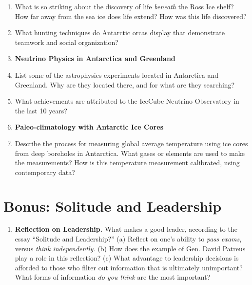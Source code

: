 \documentclass[10pt]{article}
\begin{document}
\begin{enumerate}
\item What is so striking about the discovery of life \textit{beneath} the Ross Ice shelf?  How far away from the sea ice does life extend? How was this life discovered? \\ \vspace{1.5cm}
\item What hunting techniques do Antarctic orcas display that demonstrate teamwork and social organization? \\ \vspace{1.5cm}
\item \textbf{Neutrino Physics in Antarctica and Greenland}
\item List some of the astrophysics experiments located in Antarctica and Greenland.  Why are they located there, and for what are they searching? \\ \vspace{1.5cm}
\item What achievements are attributed to the IceCube Neutrino Observatory in the last 10 years? \\ \vspace{1.5cm}
\item \textbf{Paleo-climatology with Antarctic Ice Cores}
\item Describe the process for measuring global average temperature using ice cores from deep boreholes in Antarctica.  What gases or elements are used to make the measurements? How is this temperature measurement calibrated, using contemporary data? \\ \vspace{1.5cm}
\end{enumerate}

\section{Bonus: Solitude and Leadership}

\begin{enumerate}
\item \textbf{Reflection on Leadership.}  What makes a good leader, according to the essay ``Solitude and Leadership?'' (a) Reflect on one's ability to \textit{pass exams}, versus \textit{think independently.} (b) How does the example of Gen. David Patreus play a role in this reflection? (c) What advantage to leadership decisions is afforded to those who filter out information that is ultimately unimportant?  What forms of information \textit{do you think} are the most important?
\end{enumerate}
\end{document}
